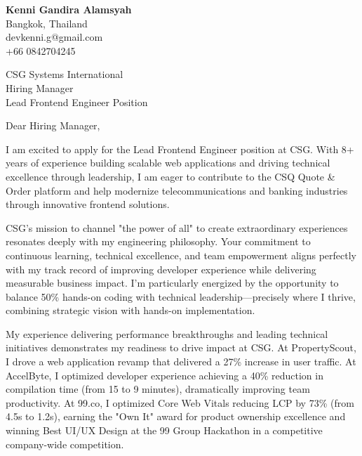 \documentclass[11pt]{article}
\begin{document}
\begin{flushleft}
\textbf{Kenni Gandira Alamsyah}\\
Bangkok, Thailand\\
devkenni.g@gmail.com\\
+66 0842704245
\end{flushleft}

\vspace{1em}

\begin{flushleft}
CSG Systems International\\
Hiring Manager\\
Lead Frontend Engineer Position
\end{flushleft}

\vspace{1em}

Dear Hiring Manager,

\vspace{0.5em}

I am excited to apply for the Lead Frontend Engineer position at CSG. With 8+ years of experience building scalable web applications and driving technical excellence through leadership, I am eager to contribute to the CSQ Quote \& Order platform and help modernize telecommunications and banking industries through innovative frontend solutions.

\vspace{0.5em}

CSG's mission to channel "the power of all" to create extraordinary experiences resonates deeply with my engineering philosophy. Your commitment to continuous learning, technical excellence, and team empowerment aligns perfectly with my track record of improving developer experience while delivering measurable business impact. I'm particularly energized by the opportunity to balance 50\% hands-on coding with technical leadership—precisely where I thrive, combining strategic vision with hands-on implementation.

\vspace{0.5em}

My experience delivering performance breakthroughs and leading technical initiatives demonstrates my readiness to drive impact at CSG. At PropertyScout, I drove a web application revamp that delivered a 27\% increase in user traffic. At AccelByte, I optimized developer experience achieving a 40\% reduction in compilation time (from 15 to 9 minutes), dramatically improving team productivity. At 99.co, I optimized Core Web Vitals reducing LCP by 73\% (from 4.5s to 1.2s), earning the "Own It" award for product ownership excellence and winning Best UI/UX Design at the 99 Group Hackathon in a competitive company-wide competition.
\end{document}
